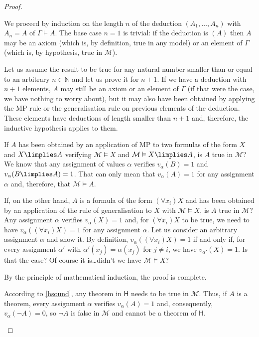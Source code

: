 \begin{proof}
\begin{parlist}
\item We proceed by induction on the length $n$ of the deduction $(A_1,\ldots,A_n)$ with $A_n = A$ of $\Gamma\vdash A$.
The base case $n=1$ is trivial: if the deduction is $(A)$ then $A$ may be an axiom (which is, by definition, true in any model) or an element of $\Gamma$ (which is, by hypothesis, true in $\mathcal{M}$).

Let us assume the result to be true for any natural number smaller than or equal to an arbitrary $n\in \mathbb{N}$ and let us prove it for $n+1$.
If we have a deduction with $n+1$ elements, $A$ may still be an axiom or an element of $\Gamma$ (if that were the case, we have nothing to worry about), but it may also have been obtained by applying the MP rule or the generalisation rule on previous elements of the deduction.
These elements have deductions of length smaller than $n+1$ and, therefore, the inductive hypothesis applies to them.

If $A$ has been obtained by an application of MP to two formulas of the form $X$ and $X\limplies A$ verifying $\mathcal{M} \vDash X$ and $\mathcal{M} \vDash X\limplies A$, is $A$ true in $\mathcal{M}$? We know that any assignment of values $\alpha$ verifies $v_\alpha(B) = 1$ and $v_\alpha(B\limplies A) = 1$. That can only mean that $v_\alpha(A) = 1$ for any assignment $\alpha$ and, therefore, that $\mathcal{M}\vDash A$.

If, on the other hand, $A$ is a formula of the form $(\forall x_i) X$ and has been obtained by an application of the rule of generalisation to $X$ with $\mathcal{M}\vDash X$, is $A$ true in $\mathcal{M}$?
Any assignment $\alpha$ verifies $v_\alpha(X) = 1$ and, for $(\forall x_i) X$ to be true, we need to have $v_\alpha( (\forall x_i) X) = 1$ for any assignment $\alpha$.
Let us consider an arbitrary assignment $\alpha$ and show it.
By definition, $v_\alpha( (\forall x_i) X ) = 1$ if and only if, for every assignment $\alpha'$ with $\alpha'(x_j) = \alpha(x_j)$ for $j \neq i$, we have $v_{\alpha'}(X) = 1$. Is that the case? Of course it is\ldots didn't we have $\mathcal{M}\vDash X$?

By the principle of mathematical induction, the proof is complete.

\item According to \ref{hsound}, any theorem in $\mathsf{H}$ needs to be true in $\mathcal{M}$. Thus, if $A$ is a theorem, every assignment $\alpha$ verifies $v_\alpha(A) = 1$ and, consequently, $v_\alpha(\lnot A) = 0$, so $\lnot A$ is false in $\mathcal{M}$ and cannot be a theorem of $\mathsf{H}$.


\end{parlist}
\end{proof}
